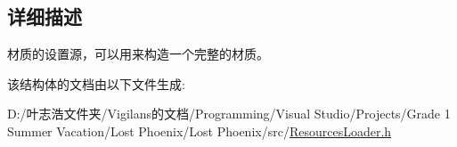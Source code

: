 \subsection{详细描述}
材质的设置源，可以用来构造一个完整的材质。 



该结构体的文档由以下文件生成\+:\begin{DoxyCompactItemize}
\item 
D\+:/叶志浩文件夹/\+Vigilans的文档/\+Programming/\+Visual Studio/\+Projects/\+Grade 1 Summer Vacation/\+Lost Phoenix/\+Lost Phoenix/src/\hyperlink{_resources_loader_8h}{Resources\+Loader.\+h}\end{DoxyCompactItemize}
